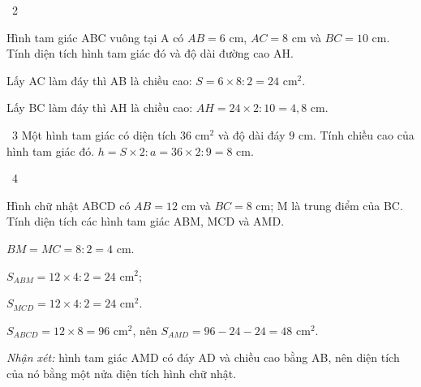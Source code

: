 \gap
\begin{exbox}{\ExWord\ 2}
\begin{minipage}[t]{0.62\linewidth}
Hình tam giác ABC vuông tại A có $AB=6$ cm, $AC=8$ cm và $BC=10$ cm. Tính diện tích hình tam giác đó và độ dài đường cao AH.
\end{minipage}\hfill
\begin{minipage}[t]{0.34\linewidth}\vspace{0pt}\centering
{}
\end{minipage}
\guide
Lấy AC làm đáy thì AB là chiều cao: $S=6\times8:2=24$ cm$^2$.\par
Lấy BC làm đáy thì AH là chiều cao: $AH=24\times2:10=4{,}8$ cm.
\end{exbox}
\gap
\begin{exbox}{\ExWord\ 3}
Một hình tam giác có diện tích $36$ cm$^2$ và độ dài đáy $9$ cm. Tính chiều cao của hình tam giác đó.
\guide
$h=S\times2:a=36\times2:9=8$ cm.
\end{exbox}
\gap
\begin{exbox}{\ExWord\ 4}
\begin{minipage}[t]{0.6\linewidth}
Hình chữ nhật ABCD có $AB=12$ cm và $BC=8$ cm; M là trung điểm của BC. Tính diện tích các hình tam giác ABM, MCD và AMD.
\end{minipage}\hfill
\begin{minipage}[t]{0.36\linewidth}\vspace{0pt}\centering
{}
\end{minipage}
\guide
$BM=MC=8:2=4$ cm.\par $S_{ABM}=12\times4:2=24$ cm$^2$;\par $S_{MCD}=12\times4:2=24$ cm$^2$.\par
$S_{ABCD}=12\times8=96$ cm$^2$, nên $S_{AMD}=96-24-24=48$ cm$^2$.\par
\emph{Nhận xét:} hình tam giác AMD có đáy AD và chiều cao bằng AB, nên diện tích của nó bằng một nửa diện tích hình chữ nhật.
\end{exbox}
